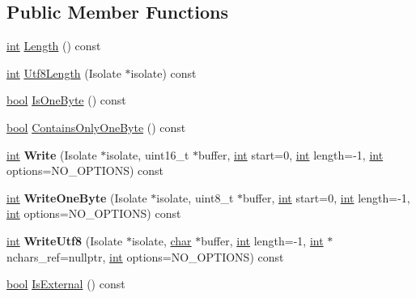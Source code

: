 \subsection*{Public Member Functions}
\begin{DoxyCompactItemize}
\item 
\mbox{\hyperlink{classint}{int}} \mbox{\hyperlink{classv8_1_1String_afaa18eae27056bb7058f09920a238f53}{Length}} () const
\item 
\mbox{\hyperlink{classint}{int}} \mbox{\hyperlink{classv8_1_1String_af99433ee51ed45337e5b4536bd28a834}{Utf8\+Length}} (Isolate $\ast$isolate) const
\item 
\mbox{\hyperlink{classbool}{bool}} \mbox{\hyperlink{classv8_1_1String_a8f14ab3aff52295d2d3245081a1b29eb}{Is\+One\+Byte}} () const
\item 
\mbox{\hyperlink{classbool}{bool}} \mbox{\hyperlink{classv8_1_1String_a29b9bc5f71fba74af478e806b9d6a1d6}{Contains\+Only\+One\+Byte}} () const
\item 
\mbox{\label{classv8_1_1String_a7196c4beb54cdbeaa31b84724c71a2dc}} 
\mbox{\hyperlink{classint}{int}} {\bfseries Write} (Isolate $\ast$isolate, uint16\+\_\+t $\ast$buffer, \mbox{\hyperlink{classint}{int}} start=0, \mbox{\hyperlink{classint}{int}} length=-\/1, \mbox{\hyperlink{classint}{int}} options=N\+O\+\_\+\+O\+P\+T\+I\+O\+NS) const
\item 
\mbox{\label{classv8_1_1String_a63989b39945308d79484c1a3c4c52730}} 
\mbox{\hyperlink{classint}{int}} {\bfseries Write\+One\+Byte} (Isolate $\ast$isolate, uint8\+\_\+t $\ast$buffer, \mbox{\hyperlink{classint}{int}} start=0, \mbox{\hyperlink{classint}{int}} length=-\/1, \mbox{\hyperlink{classint}{int}} options=N\+O\+\_\+\+O\+P\+T\+I\+O\+NS) const
\item 
\mbox{\label{classv8_1_1String_a7a15f155614bef1fdda4dfc1072dc846}} 
\mbox{\hyperlink{classint}{int}} {\bfseries Write\+Utf8} (Isolate $\ast$isolate, \mbox{\hyperlink{classchar}{char}} $\ast$buffer, \mbox{\hyperlink{classint}{int}} length=-\/1, \mbox{\hyperlink{classint}{int}} $\ast$nchars\+\_\+ref=nullptr, \mbox{\hyperlink{classint}{int}} options=N\+O\+\_\+\+O\+P\+T\+I\+O\+NS) const
\item 
\mbox{\hyperlink{classbool}{bool}} \mbox{\hyperlink{classv8_1_1String_a1d24faa97c6168221ec362c395d41ce1}{Is\+External}} () const
\item 

\end{DoxyCompactItemize}
